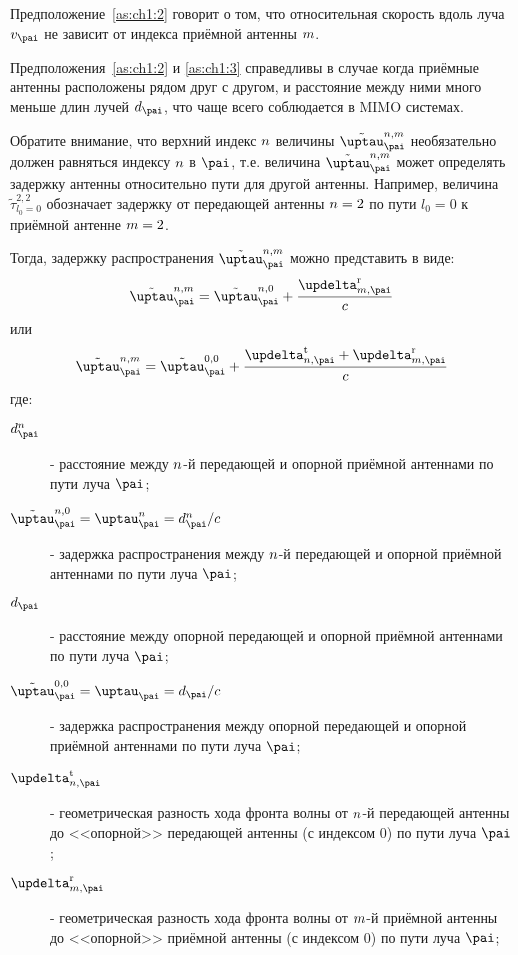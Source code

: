 Предположение~\ref{as:ch1:2} говорит о том, что относительная скорость вдоль луча $\vrel$ не зависит от индекса приёмной антенны ${m}$.

Предположения~\ref{as:ch1:2} и \ref{as:ch1:3} справедливы в случае когда приёмные антенны расположены рядом друг с другом, и расстояние между ними много меньше длин лучей $\di$, что чаще всего соблюдается в MIMO системах.

Обратите внимание, что верхний индекс ${n}$ величины $\fulldelay$ необязательно должен равняться индексу ${n}$ в $\pai$, т.е. величина $\fulldelay$ может определять задержку антенны относительно пути для другой антенны. Например, величина $\tilde{\tau}_{l_0=0}^{2,2}$ обозначает задержку от передающей антенны ${n}=2$ по пути $l_0=0$ к приёмной антенне ${m}=2$.

Тогда, задержку распространения $\fulldelay$ можно представить в виде:
\begin{equation}
\label{eq:ch1:8}
\fulldelay = \tilde{\tau}^{\txi,0}_{\pai} + \frac{\delrx}{c}
\end{equation}
или
\begin{equation}
\label{eq:ch1:9}
\fulldelay = \tilde{\tau}^{0,0}_{\pai} + \frac{\deltx + \delrx}{c}
\end{equation}
где:
\begin{description}
	\item[$d_{\pai}^\txi$] - расстояние между ${n}$-й передающей и опорной приёмной антеннами по пути луча $\pai$;	
	\item[$\tilde{\tau}^{\txi,0}_{\pai}=\delay^\txi=d_{\pai}^\txi/c$] - задержка распространения между ${n}$-й передающей и опорной приёмной антеннами по пути луча $\pai$;
	\item[$\di$] - расстояние между опорной передающей и опорной приёмной антеннами по пути луча $\pai$;
	\item[$\tilde{\tau}^{0,0}_{\pai}=\delay=\di/c$] - задержка распространения между опорной передающей и опорной приёмной антеннами по пути луча $\pai$;
	\item[$\deltx$] - геометрическая разность хода фронта волны от ${n}$-й передающей антенны до <<опорной>> передающей антенны (с индексом 0) по пути луча $\pai$;
	\item[$\delrx$] - геометрическая разность хода фронта волны от ${m}$-й приёмной антенны до <<опорной>> приёмной антенны (с индексом 0) по пути луча $\pai$;
\end{description}

